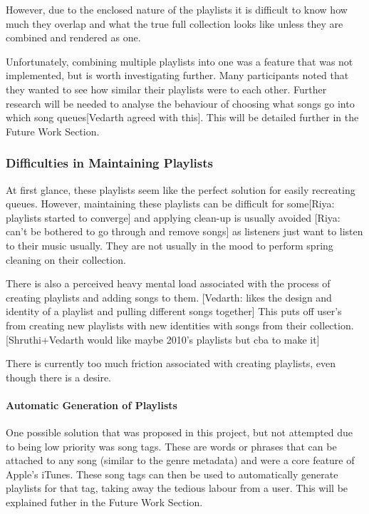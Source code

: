 However, due to the enclosed nature of the playlists it is difficult to know how much they overlap and what the true full collection looks like unless they are combined and rendered as one.

Unfortunately, combining multiple playlists into one was a feature that was not implemented, but is worth investigating further. Many participants noted that they wanted to see how similar their playlists were to each other. Further research will be needed to analyse the behaviour of choosing what songs go into which song queues[Vedarth agreed with this]. This will be detailed further in the Future Work Section.

\subsubsection{Difficulties in Maintaining Playlists}
At first glance, these playlists seem like the perfect solution for easily recreating queues. However, maintaining these playlists can be difficult for some[Riya: playlists started to converge] and applying clean-up is usually avoided [Riya: can't be bothered to go through and remove songs] as listeners just want to listen to their music usually. They are not usually in the mood to perform spring cleaning on their collection.

There is also a perceived heavy mental load associated with the process of creating playlists and adding songs to them. [Vedarth: likes the design and identity of a playlist and pulling different songs together] This puts off user's from creating new playlists with new identities with songs from their collection.[Shruthi+Vedarth would like maybe 2010's playlists but cba to make it]

There is currently too much friction associated with creating playlists, even though there is a desire.

\paragraph{Automatic Generation of Playlists}
One possible solution that was proposed in this project, but not attempted due to being low priority was song tags. These are words or phrases that can be attached to any song (similar to the genre metadata) and were a core feature of Apple's iTunes. These song tags can then be used to automatically generate playlists for that tag, taking away the tedious labour from a user. This will be explained futher in the Future Work Section.


